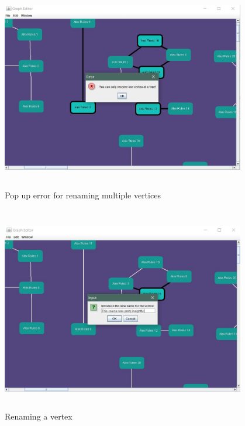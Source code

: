 \documentclass[a4paper]{article}
\begin{document}
\begin{figure}[h!]
            \centering
            \includegraphics[height=9cm,width=0.95\textwidth]{im/popUpRename.JPG}
            \caption{Pop up error for renaming multiple vertices}
            \label{fig: ErrorRen}
\end{figure}
\begin{figure}[h!]
            \centering
            \includegraphics[height=9cm,width=0.95\textwidth]{im/rename.JPG}
            \caption{Renaming a vertex}
            \label{fig: ren}
\end{figure}
\end{document}
